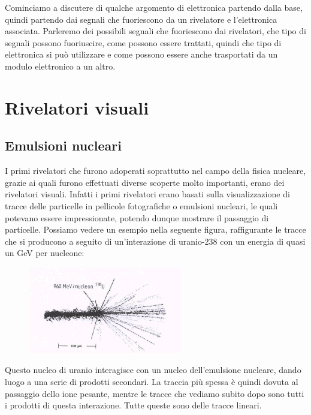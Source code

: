 Cominciamo a discutere di qualche argomento di elettronica partendo dalla base, quindi partendo dai segnali che fuoriescono da un rivelatore e l'elettronica associata. Parleremo dei possibili segnali che fuoriescono dai rivelatori, che tipo di segnali possono fuoriuscire, come possono essere trattati, quindi che tipo di elettronica si può utilizzare e come possono essere anche trasportati da un modulo elettronico a un altro. 

\section{Rivelatori visuali}


\subsection{Emulsioni nucleari}

I primi rivelatori che furono adoperati soprattutto nel campo della fisica nucleare, grazie ai quali furono effettuati diverse scoperte molto importanti, erano dei rivelatori visuali. Infatti i primi rivelatori erano basati sulla visualizzazione di tracce delle particelle in pellicole fotografiche o emulsioni nucleari, le quali potevano essere impressionate, potendo dunque mostrare il passaggio di particelle. Possiamo vedere un esempio nella seguente figura, raffigurante le tracce che si producono a seguito di un'interazione di uranio-238 con un energia di quasi un GeV per nucleone:
\begin{figure}[H]
   \centering
   \includegraphics[width=0.6\textwidth]{immagini/emulsione_nucleare.png}
\end{figure}
Questo nucleo di uranio interagisce con un nucleo dell'emulsione nucleare, dando luogo a una serie di prodotti secondari. La traccia più spessa è quindi dovuta al passaggio dello ione pesante, mentre le tracce che vediamo subito dopo sono tutti i prodotti di questa interazione. Tutte queste sono delle tracce lineari.

